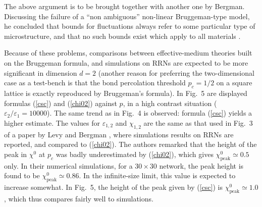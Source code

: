 The above argument is to be brought together with another one 
by Bergman. Discussing the failure of a ``non ambiguous'' 
non-linear Bruggeman-type model, he concluded that bounds 
for fluctuations always refer to some particular type of 
microstructure, and that no such bounds exist which apply 
to all materials \cite{BERG89}.

Because of these problems, comparisons between 
effective-medium theories built on the Bruggeman 
formula, and simulations on RRNs are expected to 
be more significant in dimension $d=2$ (another 
reason for preferring the two-dimensional case 
as a test-bench is that the bond percolation 
threshold $p_c=1/2$ on a square lattice is exactly 
reproduced by Bruggeman's formula). In Fig.\ 5 are 
displayed formulas (\ref{csc}) and (\ref{chi02}) 
against $p$, in a high contrast situation  
($\varepsilon_2/\varepsilon_1=10000$). The same 
trend as in Fig.\ 4 is observed: formula (\ref{csc}) 
yields a higher estimate. The values for 
$\varepsilon_{1,2}$ and $\chi_{1,2}$ are the 
same as that used in Fig.\ 3 of a paper by Levy 
and Bergman \cite{LEVY94}, where simulations results 
on RRNs are reported, and compared to (\ref{chi02}). 
The authors remarked that the height of the peak in 
$\chi^0$ at $p_c$ was badly underestimated by (\ref{chi02}), 
which gives $\chi^0_{\text{peak}}\simeq 0.5$ only. In 
their numerical simulations, for a $30\times 30$ network, 
the peak height is found to be 
$\chi^0_{\text{peak}}\simeq 0.86$. In the 
infinite-size limit, this value is expected 
to increase somewhat. In Fig.\ 5, the height 
of the peak given by (\ref{csc}) is 
$\chi^0_{\text{peak}}\simeq 1.0$, which thus 
compares fairly well to simulations.

